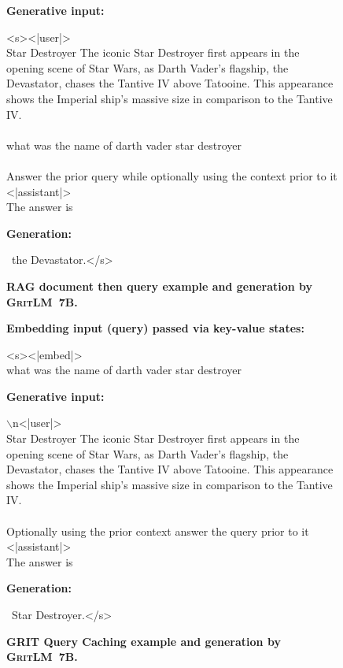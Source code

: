 \documentclass{article}
\newcommand{\modelbase}{\textsc{GritLM~7B}}
\newcommand{\method}{\textsc{GRIT}}
\begin{document}
\begin{figure}[htbp]
\hrulefill

\textbf{Generative input:}

\hrulefill

<s><|user|>\\
Star Destroyer The iconic Star Destroyer first appears in the opening scene of Star Wars, as Darth Vader's flagship, the Devastator, chases the Tantive IV above Tatooine. This appearance shows the Imperial ship's massive size in comparison to the Tantive IV.\\\\
what was the name of darth vader star destroyer\\\\
Answer the prior query while optionally using the context prior to it\\
<|assistant|>\\
The answer is

\hrulefill

\textbf{Generation:}

\hrulefill

~the Devastator.</s>

\hrulefill
\caption{\textbf{RAG document then query example and generation by \modelbase{}.}}
\label{fig:rag2}
\end{figure}


\begin{figure}[htbp]
\hrulefill

\textbf{Embedding input (query) passed via key-value states:}

\hrulefill

<s><|embed|>\\
what was the name of darth vader star destroyer

\hrulefill

\textbf{Generative input:}

\hrulefill

$\backslash$n<|user|>\\
Star Destroyer The iconic Star Destroyer first appears in the opening scene of Star Wars, as Darth Vader's flagship, the Devastator, chases the Tantive IV above Tatooine. This appearance shows the Imperial ship's massive size in comparison to the Tantive IV.\\\\
Optionally using the prior context answer the query prior to it\\
<|assistant|>\\
The answer is

\hrulefill

\textbf{Generation:}

\hrulefill

~Star Destroyer.</s>

\hrulefill

\caption{\textbf{\method{} Query Caching example and generation by \modelbase{}.}}
\label{fig:ragq}
\end{figure}
\end{document}
